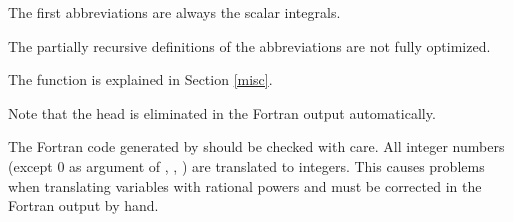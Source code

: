 {The first abbreviations are always the scalar integrals.

The partially recursive definitions of the 
abbreviations are not fully optimized. 

The function  is explained in Section 
\ref{misc}.

Note that the head  is eliminated in the 
Fortran output automatically.
}
\enom
The Fortran code generated by  should be checked with care.
All integer numbers (except 0 as argument of , , ) 
are translated to integers. This causes problems when translating 
variables with rational powers and must be corrected in the Fortran 
output by hand.


